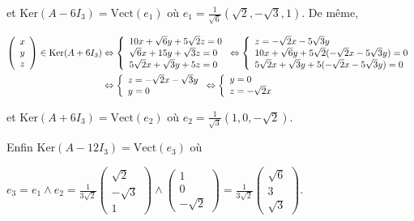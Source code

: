 {\begin{enumerate}
{et $\text{Ker}(A-6I_3) =\text{Vect}(e_1)$ où $e_1=\frac{1}{\sqrt{6}}(\sqrt{2},-\sqrt{3},1)$. De même,

   
\begin{align*}\ensuremath
\left(
\begin{array}{c}
x\\
y\\
z
\end{array}
\right)\in\text{Ker}(A+6I_3)&\Leftrightarrow\left\{
\begin{array}{l}
10x+\sqrt{6}y+5\sqrt{2}z=0\\
\sqrt{6}x+15y+\sqrt{3}z=0\\
5\sqrt{2}x+\sqrt{3}y+5z=0
\end{array}
\right.\Leftrightarrow\left\{
\begin{array}{l}
z=-\sqrt{2}x-5\sqrt{3}y\\
10x+\sqrt{6}y+5\sqrt{2}(-\sqrt{2}x-5\sqrt{3}y)=0\\
5\sqrt{2}x+\sqrt{3}y+5(-\sqrt{2}x-5\sqrt{3}y)=0
\end{array}
\right.\\
 &\Leftrightarrow\left\{
\begin{array}{l}
z=-\sqrt{2}x-\sqrt{3}y\\
y=0
\end{array}
\right.\Leftrightarrow\left\{
\begin{array}{l}
y=0\\
z=-\sqrt{2}x
\end{array}
\right.
\end{align*}

 
et $\text{Ker}(A+6I_3) =\text{Vect}(e_2)$ où $e_2=\frac{1}{\sqrt{3}}(1,0,-\sqrt{2})$.

Enfin $\text{Ker}(A-12I_3) =\text{Vect}(e_3)$ où 

\begin{center}
$e_3 =e_1\wedge e_2=\frac{1}{3\sqrt{2}}\left(
\begin{array}{c}
\sqrt{2}\\
-\sqrt{3}\\
1
\end{array}
\right)\wedge\left(
\begin{array}{c}
1\\
0\\
-\sqrt{2}
\end{array}
\right)=\frac{1}{3\sqrt{2}}\left(
\begin{array}{c}
\sqrt{6}\\
3\\
\sqrt{3}
\end{array}
\right)$.
\end{center}

}
\end{enumerate}}

